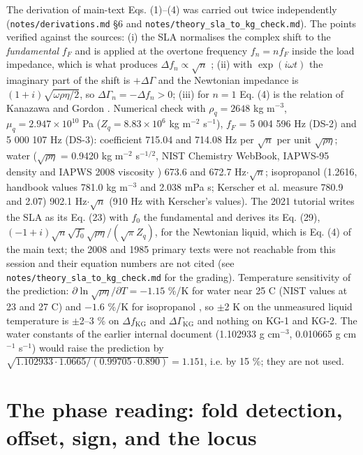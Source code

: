 \documentclass[11pt,a4paper]{article}
\begin{document}
The derivation of main-text Eqs. (1)--(4) was carried out twice independently (\texttt{notes/derivations.md} §6 and \texttt{notes/theory\_sla\_to\_kg\_check.md}). The points verified against the sources: (i) the SLA normalises the complex shift to the \emph{fundamental} $f_F$ and is applied at the overtone frequency $f_n = nf_F$ inside the load impedance, which is what produces $\Delta f_n \propto \sqrt n$ \citep{Johannsmann2008, Johannsmann2021}; (ii) with $\exp(i\omega t)$ the imaginary part of the shift is $+\Delta\Gamma$ and the Newtonian impedance is $(1+i)\sqrt{\omega\rho\eta/2}$, so $\Delta\Gamma_n = -\Delta f_n > 0$; (iii) for $n = 1$ Eq. (4) is the relation of Kanazawa and Gordon \citep{KanazawaGordon1985AC}. Numerical check with $\rho_q = 2648$ kg m$^{-3}$, $\mu_q = 2.947\times10^{10}$ Pa ($Z_q = 8.83\times10^6$ kg m$^{-2}$ s$^{-1}$), $f_F$ = 5 004 596 Hz (DS-2) and 5 000 107 Hz (DS-3): coefficient 715.04 and 714.08 Hz per $\sqrt n$ per unit $\sqrt{\rho\eta}$; water ($\sqrt{\rho\eta}$ = 0.9420 kg m$^{-2}$ s$^{-1/2}$, NIST Chemistry WebBook, IAPWS-95 density and IAPWS 2008 viscosity \citep{NISTWebBookWater}) 673.6 and 672.7 Hz$\cdot$$\sqrt n$; isopropanol (1.2616, handbook values 781.0 kg m$^{-3}$ and 2.038 mPa s; Kerscher et al. \citep{Kerscher2024} measure 780.9 and 2.07) 902.1 Hz$\cdot$$\sqrt n$ (910 Hz with Kerscher's values). The 2021 tutorial writes the SLA as its Eq. (23) with $f_0$ the fundamental and derives its Eq. (29), $(-1+i)\sqrt n\sqrt{f_0}\sqrt{\rho\eta}/(\sqrt\pi Z_q)$, for the Newtonian liquid, which is Eq. (4) of the main text; the 2008 and 1985 primary texts were not reachable from this session and their equation numbers are not cited (see \texttt{notes/theory\_sla\_to\_kg\_check.md} for the grading). Temperature sensitivity of the prediction: $\partial\ln\sqrt{\rho\eta}/\partial T = -1.15$ \%/K for water near 25 \textdegree{}C (NIST values at 23 and 27 \textdegree{}C) and $-1.6$ \%/K for isopropanol \citep{Kerscher2024}, so $\pm$2 K on the unmeasured liquid temperature is $\pm$2--3 \% on $\Delta f_\mathrm{KG}$ and $\Delta\Gamma_\mathrm{KG}$ and nothing on KG-1 and KG-2. The water constants of the earlier internal document (1.102933 g cm$^{-3}$, 0.010665 g cm$^{-1}$ s$^{-1}$) would raise the prediction by $\sqrt{1.102933\cdot1.0665/(0.99705\cdot0.890)} = 1.151$, i.e. by 15 \%; they are not used.

\section{The phase reading: fold detection, offset, sign, and the locus}
\end{document}
